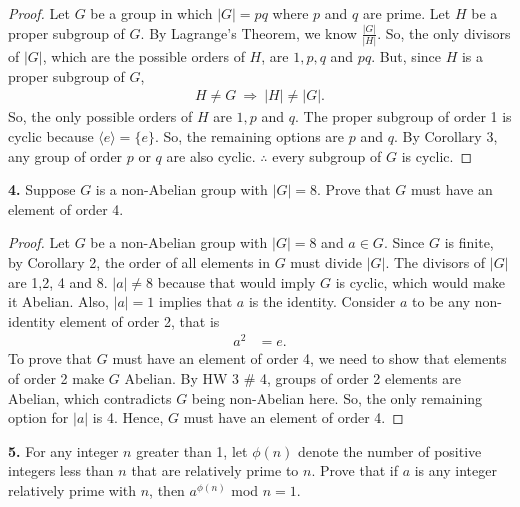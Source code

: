 \documentclass[12pt, letterpaper]{article}
\begin{document}
\begin{proof}
    Let $G$ be a group in which $|G| = pq$ where $p$ and $q$ are prime. Let $H$ be a proper subgroup of $G$. By Lagrange's Theorem, we know $\frac{|G|}{|H|}$. So, the only divisors of $|G|$, which are the possible orders of $H$, are $1, p, q$ and $pq$. But, since $H$ is a proper subgroup of $G$, 
    \begin{align*}
        H \neq G \ \Rightarrow \ |H| \neq |G|.
    \end{align*}
    So, the only possible orders of $H$ are $1, p$ and $q$. The proper subgroup of order 1 is cyclic because $\langle e \rangle = \{e\}$. So, the remaining options are $p$ and $q$. By Corollary 3, any group of order $p$ or $q$ are also cyclic. $\therefore$ every subgroup of $G$ is cyclic.
\end{proof}
\vspace{0.2em}
\textbf{4.} Suppose $G$ is a non-Abelian group with $|G|=8$. Prove that $G$ must have an element of order 4.
\begin{proof}
    Let $G$ be a non-Abelian group with $|G| = 8$ and $a \in G$. Since $G$ is finite, by Corollary 2, the order of all elements in $G$ must divide $|G|$. The divisors of $|G|$ are 1,2, 4 and 8. $|a| \neq 8$ because that would imply $G$ is cyclic, which would make it Abelian. Also, $|a| = 1$ implies that $a$ is the identity. Consider $a$ to be any non-identity element of order 2, that is
    \begin{align*}
        a^{2} &= e.
    \end{align*}
    To prove that $G$ must have an element of order 4, we need to show that elements of order 2 make $G$ Abelian. By HW 3 \# 4, groups of order 2 elements are Abelian, which contradicts $G$ being non-Abelian here. So, the only remaining option for $|a|$ is 4. Hence, $G$ must have an element of order 4.
\end{proof}
\vspace{0.2em}
\textbf{5.} For any integer $n$ greater than 1, let $\phi(n)$ denote the number of positive integers less than $n$ that are relatively prime to $n$. Prove that if $a$ is any integer relatively prime with $n$, then $a^{\phi(n)}$ mod $n = 1.$ 
\end{document}
